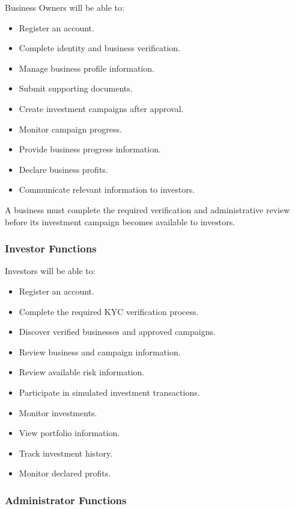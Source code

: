 Business Owners will be able to:

\begin{itemize}
    \item Register an account.
    \item Complete identity and business verification.
    \item Manage business profile information.
    \item Submit supporting documents.
    \item Create investment campaigns after approval.
    \item Monitor campaign progress.
    \item Provide business progress information.
    \item Declare business profits.
    \item Communicate relevant information to investors.
\end{itemize}

A business must complete the required verification and administrative review
before its investment campaign becomes available to investors.


\subsubsection{Investor Functions}

Investors will be able to:

\begin{itemize}
    \item Register an account.
    \item Complete the required KYC verification process.
    \item Discover verified businesses and approved campaigns.
    \item Review business and campaign information.
    \item Review available risk information.
    \item Participate in simulated investment transactions.
    \item Monitor investments.
    \item View portfolio information.
    \item Track investment history.
    \item Monitor declared profits.
\end{itemize}


\subsubsection{Administrator Functions}

